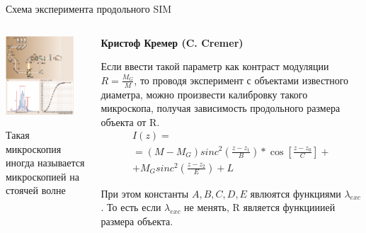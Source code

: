 \documentclass[9pt, compress, xcolor=table]{beamer}
\begin{document}
\begin{frame}{Схема эксперимента продольного SIM}
\begin{columns}[c]
\column{7cm}
\begin{center}
\includegraphics[width=0.85\textwidth]{ffm04}

{\small Такая микроскопия иногда называется микроскопией на стоячей волне}
\end{center}
\column{5.5cm}
\begin{center}
\textbf{ Кристоф Кремер (C. Cremer)}
 
 Если ввести такой параметр как контраст модуляции $R=\frac{M_G}{M}$, то проводя эксперимент с объектами известного диаметра, можно произвести калибровку такого микроскопа, получая зависимость продольного размера объекта от R.
 \begin{multline*}
 I(z)=\\=(M-M_G) sinc^2\left(\frac{z-z_1}{B}\right)*\cos[\frac{z-z_0}{C}]+\\+M_G sinc^2\left(\frac{z-z_2}{E}\right)+L
 \end{multline*}
 
 При этом константы $A,B,C,D,E$ явлюятся функциями $\lambda_{exc}$. То есть если $\lambda_{exc}$ не менять, R является функцииией размера объекта.
 
\end{center}
\end{columns}
\end{frame}
\end{document}
